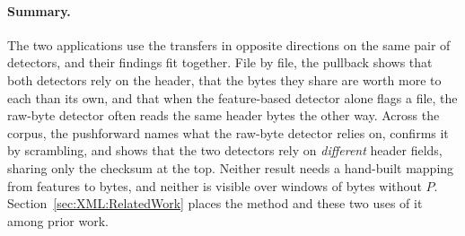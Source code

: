 \paragraph{Summary.} The two applications use the transfers in opposite directions on the same pair of detectors, and their findings fit together. File by file, the pullback shows that both detectors rely on the header, that the bytes they share are worth more to each than its own, and that when the feature-based detector alone flags a file, the raw-byte detector often reads the same header bytes the other way. Across the corpus, the pushforward names what the raw-byte detector relies on, confirms it by scrambling, and shows that the two detectors rely on \emph{different} header fields, sharing only the checksum at the top. Neither result needs a hand-built mapping from features to bytes, and neither is visible over windows of bytes without $P$. Section~\ref{sec:XML:RelatedWork} places the method and these two uses of it among prior work.
